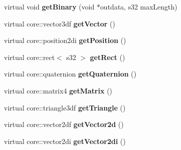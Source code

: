 \begin{DoxyCompactItemize}
\item 
\hypertarget{classirr_1_1io_1_1_i_attribute_ad6375714d5257cd174da3fc4a5a24367}{virtual void {\bfseries get\-Binary} (void $\ast$outdata, s32 max\-Length)}\label{classirr_1_1io_1_1_i_attribute_ad6375714d5257cd174da3fc4a5a24367}

\item 
\hypertarget{classirr_1_1io_1_1_i_attribute_a50c04df82d1e227e2e384b0ca48c8800}{virtual core\-::vector3df {\bfseries get\-Vector} ()}\label{classirr_1_1io_1_1_i_attribute_a50c04df82d1e227e2e384b0ca48c8800}

\item 
\hypertarget{classirr_1_1io_1_1_i_attribute_a820efe717c84c4c2f12ab5360fa0f1c3}{virtual core\-::position2di {\bfseries get\-Position} ()}\label{classirr_1_1io_1_1_i_attribute_a820efe717c84c4c2f12ab5360fa0f1c3}

\item 
\hypertarget{classirr_1_1io_1_1_i_attribute_a97b6a03a87358d3a4fadb4c40c863803}{virtual core\-::rect$<$ s32 $>$ {\bfseries get\-Rect} ()}\label{classirr_1_1io_1_1_i_attribute_a97b6a03a87358d3a4fadb4c40c863803}

\item 
\hypertarget{classirr_1_1io_1_1_i_attribute_a7b7d5d0370a7d525c3cc11b251ec6295}{virtual core\-::quaternion {\bfseries get\-Quaternion} ()}\label{classirr_1_1io_1_1_i_attribute_a7b7d5d0370a7d525c3cc11b251ec6295}

\item 
\hypertarget{classirr_1_1io_1_1_i_attribute_a98982159940a6c2dd5b01fc8e98311ba}{virtual core\-::matrix4 {\bfseries get\-Matrix} ()}\label{classirr_1_1io_1_1_i_attribute_a98982159940a6c2dd5b01fc8e98311ba}

\item 
\hypertarget{classirr_1_1io_1_1_i_attribute_a74a74cb75d8dba28af24775ad3adb556}{virtual core\-::triangle3df {\bfseries get\-Triangle} ()}\label{classirr_1_1io_1_1_i_attribute_a74a74cb75d8dba28af24775ad3adb556}

\item 
\hypertarget{classirr_1_1io_1_1_i_attribute_ad623ac5e9547b93e6b384a00dd315c73}{virtual core\-::vector2df {\bfseries get\-Vector2d} ()}\label{classirr_1_1io_1_1_i_attribute_ad623ac5e9547b93e6b384a00dd315c73}

\item 
\hypertarget{classirr_1_1io_1_1_i_attribute_a4324d95594c67404791601d7712edac6}{virtual core\-::vector2di {\bfseries get\-Vector2di} ()}\label{classirr_1_1io_1_1_i_attribute_a4324d95594c67404791601d7712edac6}


\end{DoxyCompactItemize}
